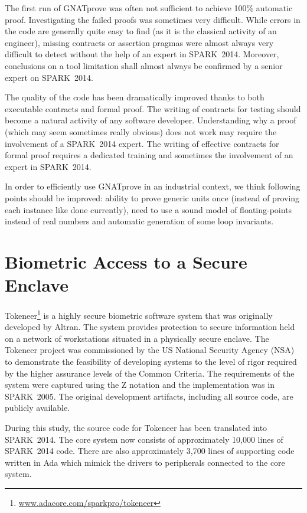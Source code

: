 \documentclass[10pt,a4paper,twocolumn]{article}
\newcommand{\gnatprove}{GNATprove\xspace}
\newcommand{\oldspark}{SPARK~2005\xspace}
\newcommand{\newspark}{SPARK~2014\xspace}
\begin{document}
The first run of \gnatprove was often not sufficient to achieve 100\%
automatic proof. Investigating the failed proofs was sometimes very
difficult. While errors in the code are generally quite easy to find
(as it is the classical activity of an engineer), missing contracts or
assertion pragmas were almost always very difficult to detect without
the help of an expert in \newspark. Moreover, conclusions on a tool
limitation shall almost always be confirmed by a senior expert on
\newspark.

The quality of the code has been dramatically improved thanks to both
executable contracts and formal proof. The writing of contracts for
testing should become a natural activity of any software
developer. Understanding why a proof (which may seem sometimes really
obvious) does not work may require the involvement of a \newspark
expert. The writing of effective contracts for formal proof requires a
dedicated training and sometimes the involvement of an expert in
\newspark.

In order to efficiently use \gnatprove in an industrial context, we
think following points should be improved: ability to prove generic
units once (instead of proving each instance like done currently),
need to use a sound model of floating-points instead of real numbers
and automatic generation of some loop invariants.

\section{Biometric Access to a Secure Enclave}
\label{sec:tokeneer}

Tokeneer\footnote{\url{www.adacore.com/sparkpro/tokeneer}} is a highly
secure biometric software system that was originally developed by
Altran. The system provides protection to secure information held on a
network of workstations situated in a physically secure enclave. The
Tokeneer project was commissioned by the US National Security Agency
(NSA) to demonstrate the feasibility of developing systems to the
level of rigor required by the higher assurance levels of the Common
Criteria. The requirements of the system were captured using the Z
notation and the implementation was in \oldspark. The original
development artifacts, including all source code, are publicly
available.

During this study, the source code for Tokeneer has been translated
into \newspark. The core system now consists of approximately 10,000
lines of \newspark code. There are also approximately 3,700 lines of
supporting code written in Ada which mimick the drivers to peripherals
connected to the core system.
\end{document}
